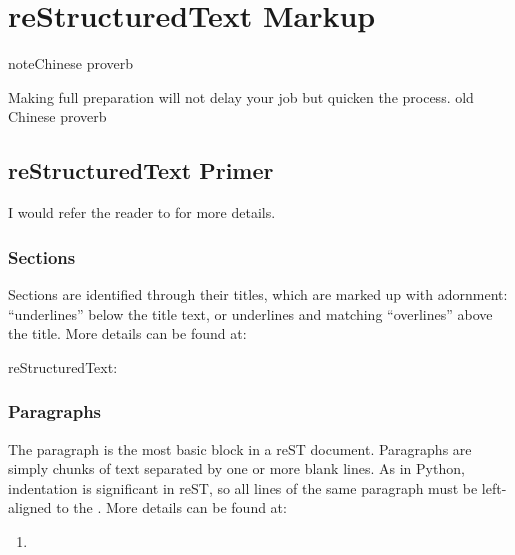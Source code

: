 \documentclass[letterpaper,12pt,english]{sphinxmanual}
\begin{document}
\chapter{reStructuredText Markup}
\label{\detokenize{rtxt:restructuredtext-markup}}\label{\detokenize{rtxt:rtext}}\label{\detokenize{rtxt::doc}}
\begin{sphinxadmonition}{note}{Chinese proverb}

Making full preparation will not delay your job but quicken the process. \textendash{} old Chinese proverb
\end{sphinxadmonition}


\section{reStructuredText Primer}
\label{\detokenize{rtxt:restructuredtext-primer}}
I would refer the reader to  for more details.


\subsection{Sections}
\label{\detokenize{rtxt:sections}}
Sections are identified through their titles, which are marked up with adornment: “underlines” below the title text, or underlines and matching “overlines” above the title. More details can be found at: 

reStructuredText:

\begin{sphinxVerbatim}[commandchars=\\\{\}]


\end{sphinxVerbatim}


\subsection{Paragraphs}
\label{\detokenize{rtxt:paragraphs}}
The paragraph is the most basic block in a reST document.
Paragraphs are simply chunks of text separated by one or
more blank lines. As in Python, indentation is significant
in reST, so all lines of the same paragraph must be
left-aligned to the . More
details can be found at: 
\begin{enumerate}
\def\theenumi{\arabic{enumi}}
\def\labelenumi{\theenumi .}
\makeatletter\def\p@enumii{\p@enumi \theenumi .}\makeatother
\item {} 

\end{enumerate}
\end{document}

